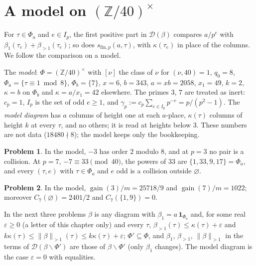 \documentclass[reqno]{amsart}
\newcounter{chap}
\theoremstyle{plain}
\theoremstyle{definition}
\newtheorem{problem}{Problem}[section]
\theoremstyle{remark}
\newcommand{\Z}{{\mathbb{Z}}}
\newcommand{\Dc}{\mathcal D}
\newcommand{\gain}{\operatorname{gain}}
\newcommand{\sfp}{s_{\mathrm{fin},p}}
\newcommand{\nb}[1]{\lVert #1 \rVert}
\newcommand{\bo}{\beta_1}
\newcommand{\bl}{\beta_{>1}}
\newcommand{\bb}{\nb{\beta}_{>1}}
\begin{document}
\section{A model on \texorpdfstring{\((\Z/40)^\times\)}{(Z/40)x}}\label{sec:model}

For \(\tau \in \Phi_a\) and \(e \in I_p\), the first positive part in \(\Dc(\beta)\) compares \(a/p^e\) with \(\bo(\tau_e) + \bl(\tau_e)\); so does \(\sfp(a, \tau)\), with \(\kappa(\tau_e)\) in place of the columns.  We follow the comparison on a model.

The \emph{model}: \(\Phi = (\Z/40)^\times\) with \([\nu]\) the class of \(\nu\) for \((\nu, 40) = 1\), \(q_0 = 8\), \(\Phi_a = \{\tau \equiv 1 \bmod 8\}\), \(\Phi_b = \{7\}\), \(x = 6\), \(b = 343\), \(a = xb = 2058\), \(x_1 = 49\), \(k = 2\), \(\kappa = b\) on \(\Phi_b\) and \(\kappa = a/x_1 = 42\) elsewhere.  The primes \(3\), \(7\) are treated as inert: \(c_p = 1\), \(I_p\) is the set of odd \(e \ge 1\), and \(\gamma_p := c_p\sum_{e \in I_p} p^{-e} = p/(p^2-1)\).  The \emph{model diagram} has \(a\) columns of height one at each \(a\)-place, \(\kappa(\tau)\) columns of height \(k\) at every \(\tau\), and no others; it is read at heights below \(3\).  These numbers are not data (\(18480 \nmid 8\)); the model keeps only the bookkeeping.

\begin{problem}\label{pr:toy-classes}
In the model, \(-3\) has order \(2\) modulo \(8\), and at \(p = 3\) no pair is a collision.  At \(p = 7\), \(-7 \equiv 33 \pmod{40}\), the powers of \(33\) are \(\{1, 33, 9, 17\} = \Phi_a\), and every \((\tau, e)\) with \(\tau \in \Phi_a\) and \(e\) odd is a collision outside \(\varnothing\).
\end{problem}

\begin{problem}\label{pr:toy-gain}
In the model, \(\gain(3)/m = 25718/9\) and \(\gain(7)/m = 1022\); moreover \(C_7(\varnothing) = 2401/2\) and \(C_7(\{1, 9\}) = 0\).
\end{problem}

In the next three problems \(\beta\) is any diagram with \(\bo = a\,\mathbf 1_{\Phi_a}\) and, for some real \(\varepsilon \ge 0\) (a letter of this chapter only) and every \(\tau\), \(\bl(\tau) \le \kappa(\tau) + \varepsilon\) and \(k\kappa(\tau) \le \bb(\tau) \le k\kappa(\tau) + \varepsilon\); \(\Phi' \subseteq \Phi\), and \(\bo\), \(\bl\), \(\bb\) in the terms of \(\Dc(\beta \smallsetminus \Phi')\) are those of \(\beta \smallsetminus \Phi'\) (only \(\bo\) changes).  The model diagram is the case \(\varepsilon = 0\) with equalities.
\end{document}
